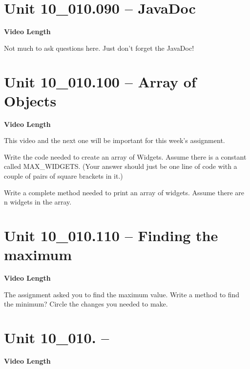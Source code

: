 \documentclass[letterpaper,12pt]{exam}
\newcommand{\unit}{Unit 10}
\begin{document}
\begin{questions}
\section*{\unit\_010.090 -- JavaDoc} 
\par{\selectfont\textbf{Video Length }}

Not much to ask questions here.  Just don't forget the JavaDoc!

\section*{\unit\_010.100 -- Array of Objects } 
\par{\selectfont\textbf{Video Length }}

This video and the next one will be important for this week's assignment.

\begin{samepage}
    \question Write the code needed to create an array of Widgets.  Assume there is a constant called MAX\_WIDGETS. (Your answer should just be one line of code with a couple of pairs of square brackets in it.)
    \vspace{5mm}
\end{samepage}

\begin{samepage}
    \question Write a complete method needed to print an array of widgets.  Assume there are n widgets in the array.
    \vspace{55mm}
\end{samepage}

\section*{\unit\_010.110 -- Finding the maximum} 
\par{\selectfont\textbf{Video Length }}

\begin{samepage}
    \question The assignment asked you to find the maximum value.  Write a method to find the minimum?  Circle the changes you needed to make.
    \vspace{55mm}
\end{samepage}


\section*{\unit\_010. -- } 
\par{\selectfont\textbf{Video Length }}


\end{questions}
\end{document}
